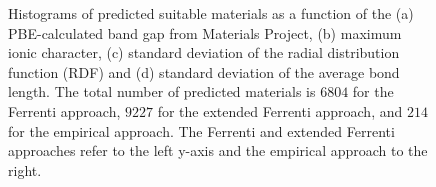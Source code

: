 \documentclass[superscriptaddress,unsortedaddress,
 amsmath,amssymb,
 aps,
]{revtex4-2}
\begin{document}
\begin{figure}[ht]
    \begin{subfigure}[b]{1\textwidth}
    \centering
    
  \end{subfigure}
  \par\bigskip
\begin{subfigure}[b]{0.45\textwidth}
    
    \subcaption{}
\end{subfigure}
\begin{subfigure}[b]{0.45\textwidth}
    
    \subcaption{}
\end{subfigure}%

\begin{subfigure}[b]{0.45\textwidth}
    
    \subcaption{}
\end{subfigure}
\begin{subfigure}[b]{0.45\textwidth}
    
    \subcaption{}
\end{subfigure}
\caption{Histograms of predicted suitable materials as a function of the (a) PBE-calculated band gap from Materials Project, (b) maximum ionic character, (c) standard deviation of the radial distribution function (RDF) and (d) standard deviation of the average bond length. The total number of predicted materials is  $6804$ for the Ferrenti approach, $9227$ for the extended Ferrenti approach, and $214$ for the empirical approach. The Ferrenti and extended Ferrenti approaches refer to the left y-axis and the empirical approach to the right.
    }
\label{fig:histogram_new}
\end{figure}
\end{document}
